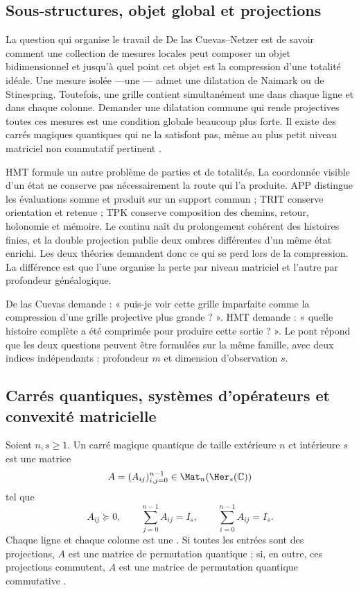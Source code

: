 \subsection{Sous-structures, objet global et projections}

La question qui organise le travail de De las Cuevas--Netzer est de savoir comment une
collection de mesures locales peut composer un objet bidimensionnel et jusqu'à
quel point cet objet est la compression d'une totalité idéale. Une mesure
isolée ---une \POVM--- admet une dilatation de Naimark ou de Stinespring. Toutefois,
une grille contient simultanément une \POVM dans chaque ligne et dans
chaque colonne. Demander une dilatation commune qui rende projectives toutes ces
mesures est une condition globale beaucoup plus forte. Il existe des carrés magiques
quantiques qui ne la satisfont pas, même au plus petit niveau matriciel non commutatif
pertinent \citep{delascuevas2020qms}.

HMT formule un autre problème de parties et de totalités. La coordonnée visible d'un
état ne conserve pas nécessairement la route qui l'a produite. APP distingue les
évaluations somme et produit sur un support commun ; TRIT conserve orientation
et retenue ; TPK conserve composition des chemins, retour, holonomie et mémoire.
Le continu naît du prolongement cohérent des histoires finies, et la
double projection publie deux ombres différentes d'un même état
enrichi. Les deux théories demandent donc ce qui se perd lors de la compression.
La différence est que l'une organise la perte par niveau matriciel et l'autre par
profondeur généalogique.

\begin{intuitionbox}
De las Cuevas demande : « puis-je voir cette grille imparfaite comme la
compression d'une grille projective plus grande ? ». HMT demande : « quelle histoire
complète a été comprimée pour produire cette sortie ? ». Le pont répond que
les deux questions peuvent être formulées sur la même famille, avec deux indices
indépendants : profondeur $m$ et dimension d'observation $s$.
\end{intuitionbox}

\subsection{Carrés quantiques, systèmes d'opérateurs et convexité matricielle}

Soient $n,s\ge1$. Un carré magique quantique de taille extérieure $n$ et
intérieure $s$ est une matrice
\[
 A=(A_{ij})_{i,j=0}^{n-1}\in\Mat_n(\Her_s(\mathbb C))
\]
tel que
\[
 A_{ij}\succeq0,\qquad
 \sum_{j=0}^{n-1}A_{ij}=I_s,\qquad
 \sum_{i=0}^{n-1}A_{ij}=I_s.
 \tag{GMC-1.1}
\]
Chaque ligne et chaque colonne est une \POVM. Si toutes les entrées sont des projections,
$A$ est une matrice de permutation quantique ; si, en outre, ces projections
commutent, $A$ est une matrice de permutation quantique commutative
\citep{delascuevas2020qms,delascuevas2023latin}.

